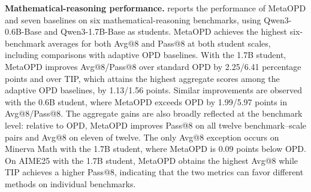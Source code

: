 \documentclass{article}
\theoremstyle{plain}
\theoremstyle{definition}
\theoremstyle{remark}
\begin{document}


\textbf{Mathematical-reasoning performance.}
 reports the performance of MetaOPD and seven baselines on six mathematical-reasoning benchmarks, using Qwen3-0.6B-Base and Qwen3-1.7B-Base as students. MetaOPD achieves the highest six-benchmark averages for both Avg@8 and Pass@8 at both student scales, including comparisons with adaptive OPD baselines. With the 1.7B student, MetaOPD improves Avg@8/Pass@8 over standard OPD by 2.25/6.41 percentage points and over TIP, which attains the highest aggregate scores among the adaptive OPD baselines, by 1.13/1.56 points. Similar improvements are observed with the 0.6B student, where MetaOPD exceeds OPD by 1.99/5.97 points in Avg@8/Pass@8. The aggregate gains are also broadly reflected at the benchmark level: relative to OPD, MetaOPD improves Pass@8 on all twelve benchmark–scale pairs and Avg@8 on eleven of twelve. The only Avg@8 exception occurs on Minerva Math with the 1.7B student, where MetaOPD is 0.09 points below OPD. On AIME25 with the 1.7B student, MetaOPD obtains the highest Avg@8 while TIP achieves a higher Pass@8, indicating that the two metrics can favor different methods on individual benchmarks.
\end{document}

